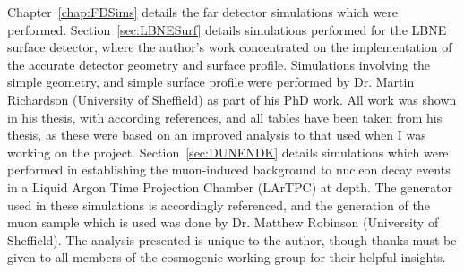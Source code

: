 \begin{declaration}
  Chapter~\ref{chap:FDSims} details the far detector simulations which were performed. Section~\ref{sec:LBNESurf} details simulations performed for the LBNE surface detector, where the author's work concentrated on the implementation of the accurate detector geometry and surface profile. Simulations involving the simple geometry, and simple surface profile were performed by Dr. Martin Richardson (University of Sheffield) as part of his PhD work. All work was shown in his thesis, with according references, and all tables have been taken from his thesis, as these were based on an improved analysis to that used when I was working on the project. Section~\ref{sec:DUNENDK} details simulations which were performed in establishing the muon-induced background to nucleon decay events in a Liquid Argon Time Projection Chamber (LArTPC) at depth. The generator used in these simulations is accordingly referenced, and the generation of the muon sample which is used was done by Dr. Matthew Robinson (University of Sheffield). The analysis presented is unique to the author, though thanks must be given to all members of the cosmogenic working group for their helpful insights. \\
  

\end{declaration}

